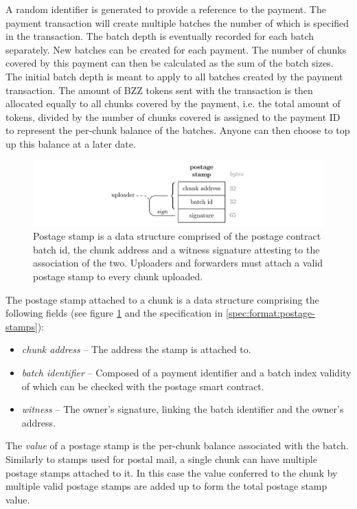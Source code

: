 A random identifier is generated to provide a reference to the payment. 
The payment transaction will create multiple batches the number of which is specified in the transaction. The batch depth is eventually recorded for each batch separately. New batches can be created for each payment.
The number of chunks covered by this payment can then be calculated as the sum of the batch sizes. The initial batch depth is meant to apply to all batches created by  the payment transaction. The amount of BZZ tokens sent with the transaction is then allocated equally to all chunks covered by the payment, i.e. the total amount of tokens, divided by the number of chunks covered is assigned to the payment ID to represent the per-chunk balance of the batches. Anyone can then choose to top up this balance at a later date. 


\begin{figure}[htbp]
  \centering
    \includegraphics[width=\textwidth]{fig/postage-stamp-structure.pdf}
  \caption[Postage stamp \statusgreen]{Postage stamp is a data structure comprised of the postage contract batch id, the chunk address and a witness signature attesting to the association of the two. Uploaders and forwarders must attach a valid postage stamp to every chunk uploaded. }
  \label{fig:postage-stamp}
\end{figure}


The postage stamp attached to a chunk is a data structure comprising the following fields (see figure  \ref{fig:postage-stamp}  and the specification in \ref{spec:format:postage-stamps}):

\begin{itemize}
    \item \emph{chunk address} -- The address the stamp is attached to. 
    \item \emph{batch identifier} -- Composed of a payment identifier and a batch index validity of which can be checked with the postage smart contract.
    \item \emph{witness} -- The owner's signature, linking the batch identifier and the owner's address.
\end{itemize}

The \emph{value} of a postage stamp is the per-chunk balance associated with the batch.
Similarly to stamps used for postal mail, a single chunk can have multiple postage stamps attached to it. In this case the value conferred to the chunk by multiple valid postage stamps are added up to form the total postage stamp value. 

